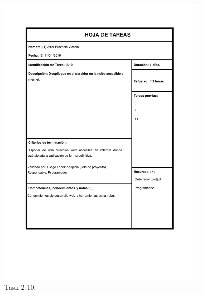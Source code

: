 \documentclass{DeustoFDP}
\begin{document}
\begin{figure}[H]
	\centering
	\includegraphics[width=0.9\textwidth]{fig/Tareas/210}
	\caption{Task 2.10.}
	\label{fig:t210}
\end{figure}
\end{document}
